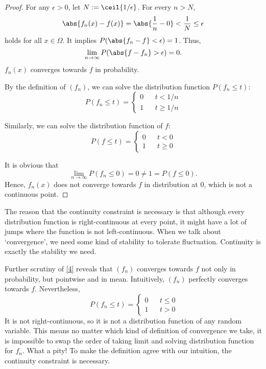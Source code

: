    \begin{proof}
        For any $\epsilon > 0$, let $N := \ceil{1 / \epsilon}$. For every $n > N$, \[
            \abs{f_n(x) - f(x)} = \abs{\frac{1}{n} - 0} < \frac{1}{N} \leq \epsilon
        \]
        holds for all $x \in \Omega$. It implies $P(\abs{f_n - f} < \epsilon) = 1$. Thus, \[
            \lim_{n \to \infty} P(\abs{f - f_n} > \epsilon) = 0.    
        \]
        $f_n(x)$ converges towards $f$ in probability.

        By the definition of $(f_n)$, we can solve the distribution function $P(f_n \leq t)$: \[
            P(f_n \leq t) = \left\{
                \begin{array}{lcl}
                    0 & & t < 1 / n \\
                    1 & & t \geq 1 / n
                \end{array}
            \right.
        \]

        Similarly, we can solve the distribution function of $f$: \[
            P(f \leq t) = \left\{
                \begin{array}{lcl}
                    0 & & t < 0  \\
                    1 & & t \geq 0
                \end{array}
            \right.
        \]

        It is obvious that \[
            \lim_{n \to \infty} P(f_n \leq 0) = 0 \neq 1 = P(f \leq 0).
        \]
        Hence, $f_n(x)$ does not converge towards $f$ in distribution at $0$, which is not a continuous point.
    \end{proof}

    The reason that the continuity constraint is necessary is that although every distribution function is right-continuous at every point, it might have a lot of jumps where the function is not left-continuous. When we talk about `convergence', we need some kind of stability to tolerate fluctuation. Continuity is exactly the stability we need.

    Further scrutiny of \cref{4} reveals that $(f_n)$ converges towards $f$ not only in probability, but pointwise and in mean. Intuitively, $(f_n)$ perfectly converges towards $f$. Nevertheless, \[\
        P(f_n \leq t) = \left\{
            \begin{array}{lcl}
                0 & & t \leq 0 \\
                1 & & t > 0
            \end{array}
        \right.
    \]
    It is not right-continuous, so it is not a distribution function of any random variable. This means no matter which kind of definition of convergence we take, it is impossible to swap the order of taking limit and solving distribution function for $f_n$. What a pity! To make the definition agree with our intuition, the continuity constraint is necessary.

